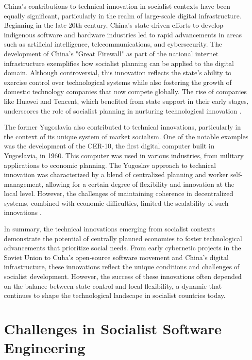 \begin{refsection}
China's contributions to technical innovation in socialist contexts have been equally significant, particularly in the realm of large-scale digital infrastructure. Beginning in the late 20th century, China’s state-driven efforts to develop indigenous software and hardware industries led to rapid advancements in areas such as artificial intelligence, telecommunications, and cybersecurity. The development of China's "Great Firewall" as part of the national internet infrastructure exemplifies how socialist planning can be applied to the digital domain. Although controversial, this innovation reflects the state’s ability to exercise control over technological systems while also fostering the growth of domestic technology companies that now compete globally. The rise of companies like Huawei and Tencent, which benefited from state support in their early stages, underscores the role of socialist planning in nurturing technological innovation \cite[pp.~65-68]{huang2010}.

The former Yugoslavia also contributed to technical innovations, particularly in the context of its unique system of market socialism. One of the notable examples was the development of the CER-10, the first digital computer built in Yugoslavia, in 1960. This computer was used in various industries, from military applications to economic planning. The Yugoslav approach to technical innovation was characterized by a blend of centralized planning and worker self-management, allowing for a certain degree of flexibility and innovation at the local level. However, the challenges of maintaining coherence in decentralized systems, combined with economic difficulties, limited the scalability of such innovations \cite[pp.~54-56]{djilas1957}.

In summary, the technical innovations emerging from socialist contexts demonstrate the potential of centrally planned economies to foster technological advancements that prioritize social needs. From early cybernetic projects in the Soviet Union to Cuba’s open-source software movement and China’s digital infrastructure, these innovations reflect the unique conditions and challenges of socialist development. However, the success of these innovations often depended on the balance between state control and local flexibility, a dynamic that continues to shape the technological landscape in socialist countries today.

\section{Challenges in Socialist Software Engineering}


\end{refsection}
